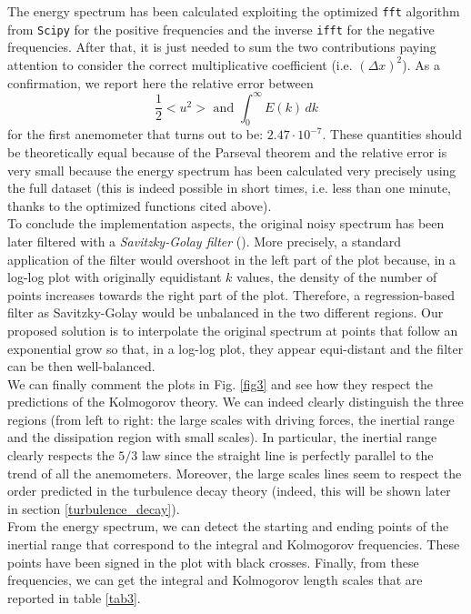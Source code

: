 \documentclass[11pt,titlepage]{article}
\begin{document}
The energy spectrum has been calculated exploiting the optimized \texttt{fft} algorithm from \texttt{Scipy} for the positive frequencies and the inverse \texttt{ifft} for the negative frequencies. After that, it is just needed to sum the two contributions paying attention to consider the correct multiplicative coefficient (i.e. $(\Delta x)^2$). As a confirmation, we report here the relative error between
\begin{equation*}
	\frac{1}{2}<u^2> \text{ and } \int_0^\infty E(k)\, dk
\end{equation*}
for the first anemometer that turns out to be: $2.47 \cdot 10^{-7}$. These quantities should be theoretically equal because of the Parseval theorem and the relative error is very small because the energy spectrum has been calculated very precisely using the full dataset (this is indeed possible in short times, i.e. less than one minute, thanks to the optimized functions cited above). \\
To conclude the implementation aspects, the original noisy spectrum has been later filtered with a \emph{Savitzky-Golay filter} (\cite{savgol}). More precisely, a standard application of the filter would overshoot in the left part of the plot because, in a log-log plot with originally equidistant $k$ values, the density of the number of points increases towards the right part of the plot. Therefore, a regression-based filter as Savitzky-Golay would be unbalanced in the two different regions. Our proposed solution is to interpolate the original spectrum at points that follow an exponential grow so that, in a log-log plot, they appear equi-distant and the filter can be then well-balanced. \\
We can finally comment the plots in Fig. \ref{fig3} and see how they respect the predictions of the Kolmogorov theory. We can indeed clearly distinguish the three regions (from left to right: the large scales with driving forces, the inertial range and the dissipation region with small scales). In particular, the inertial range clearly respects the $5/3$ law since the straight line is perfectly parallel to the trend of all the anemometers. Moreover, the large scales lines seem to respect the order predicted in the turbulence decay theory (indeed, this will be shown later in section \ref{turbulence_decay}). \\
From the energy spectrum, we can detect the starting and ending points of the inertial range that correspond to the integral and Kolmogorov frequencies. These points have been signed in the plot with black crosses. Finally, from these frequencies, we can get the integral and Kolmogorov length scales that are reported in table \ref{tab3}. \\
\end{document}
